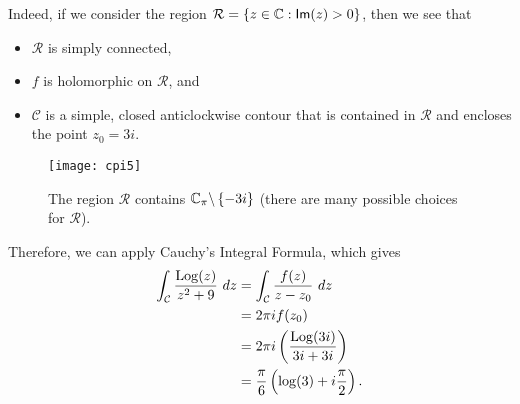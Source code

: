 Indeed, if we consider the region $\mathcal{R} = \left\{ z \in \mathbb{C}: \textsf{Im} (z)>0\right\}$, then we see that
\begin{itemize}
\item $\mathcal{R}$ is simply connected,
\item $f$ is holomorphic on $\mathcal{R}$, and
\item $\mathcal{C}$ is a simple, closed anticlockwise contour that is contained in $\mathcal{R}$ and encloses the point $z_0=3i$.
\end{itemize}
\begin{figure}[h]
\centering
\texttt{[image: cpi5]}
\caption{The region $\mathcal{R}$ contains $\mathbb{C}_{\pi} \backslash \left\{-3i\right\}$ (there are many possible choices for $\mathcal{R}$).}
\end{figure}
Therefore, we can apply Cauchy's Integral Formula, which gives
\begin{align*}
\int_{\mathcal{C}} \frac{\operatorname{Log}(z)}{z^2+9}\ dz &= \int_{\mathcal{C}} \frac{f(z)}{z-z_0}\ dz \\
& = 2 \pi i f(z_0) \\
& = 2 \pi i \left( \frac{\operatorname{Log}(3i)}{3i+3i} \right) \\
& = \frac{\pi}{6} \left( \log (3) + i \frac{\pi}{2} \right).
\end{align*}






